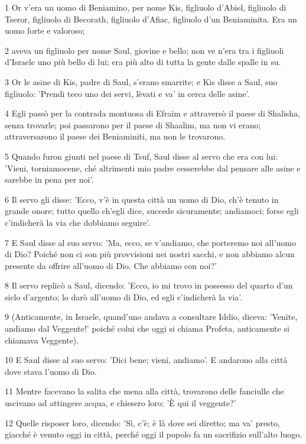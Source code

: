 \par 1 Or v'era un uomo di Beniamino, per nome Kis, figliuolo d'Abiel, figliuolo di Tseror, figliuolo di Becorath, figliuolo d'Afiac, figliuolo d'un Beniaminita. Era un uomo forte e valoroso;
\par 2 aveva un figliuolo per nome Saul, giovine e bello; non ve n'era tra i figliuoli d'Israele uno più bello di lui; era più alto di tutta la gente dalle spalle in su.
\par 3 Or le asine di Kis, padre di Saul, s'erano smarrite; e Kis disse a Saul, suo figliuolo: 'Prendi teco uno dei servi, lèvati e va' in cerca delle asine'.
\par 4 Egli passò per la contrada montuosa di Efraim e attraversò il paese di Shalisha, senza trovarle; poi passarono per il paese di Shaalim, ma non vi erano; attraversarono il paese dei Beniaminiti, ma non le trovarono.
\par 5 Quando furon giunti nel paese di Tsuf, Saul disse al servo che era con lui: 'Vieni, torniamocene, ché altrimenti mio padre cesserebbe dal pensare alle asine e sarebbe in pena per noi'.
\par 6 Il servo gli disse: 'Ecco, v'è in questa città un uomo di Dio, ch'è tenuto in grande onore; tutto quello ch'egli dice, succede sicuramente; andiamoci; forse egli c'indicherà la via che dobbiamo seguire'.
\par 7 E Saul disse al suo servo: 'Ma, ecco, se v'andiamo, che porteremo noi all'uomo di Dio? Poiché non ci son più provvisioni nei nostri sacchi, e non abbiamo alcun presente da offrire all'uomo di Dio. Che abbiamo con noi?'
\par 8 Il servo replicò a Saul, dicendo: 'Ecco, io mi trovo in possesso del quarto d'un siclo d'argento; lo darò all'uomo di Dio, ed egli c'indicherà la via'.
\par 9 (Anticamente, in Israele, quand'uno andava a consultare Iddio, diceva: 'Venite, andiamo dal Veggente!' poiché colui che oggi si chiama Profeta, anticamente si chiamava Veggente).
\par 10 E Saul disse al suo servo: 'Dici bene; vieni, andiamo'. E andarono alla città dove stava l'uomo di Dio.
\par 11 Mentre facevano la salita che mena alla città, trovarono delle fanciulle che uscivano ad attingere acqua, e chiesero loro: 'È qui il veggente?'
\par 12 Quelle risposer loro, dicendo: 'Sì, c'è; è là dove sei diretto; ma va' presto, giacché è venuto oggi in città, perché oggi il popolo fa un sacrifizio sull'alto luogo.
